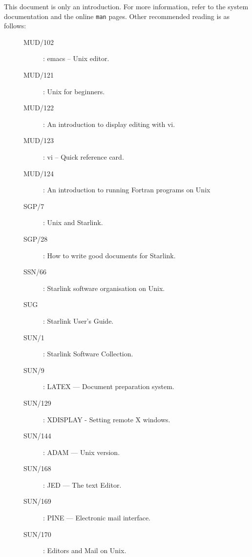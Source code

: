 \documentclass[twoside,11pt]{article}
\newcommand{\xref}[3]{#1}
\begin{document}
This document is only an introduction.
For more information, refer to the system documentation and the online {\tt man}
pages.
Other recommended reading is as follows:

\begin{description}
\item[\mbox{}]\mbox{}
\begin{description}
\item [MUD/102]: emacs -- Unix editor.
\item [MUD/121]: Unix for beginners.
\item [MUD/122]: An introduction to display editing with vi.
\item [MUD/123]: vi -- Quick reference card.
\item [MUD/124]: An introduction to running Fortran programs on Unix
\item [\xref{SGP/7}{sgp7}{}]: Unix and Starlink.
\item [\xref{SGP/28}{sgp28}{}]: How to write good documents for Starlink.
\item [\xref{SSN/66}{ssn66}{}]: Starlink software organisation on Unix.
\item [\xref{SUG}{sug}{}]: Starlink User's Guide.
\item [\xref{SUN/1}{sun1}{}]: Starlink Software Collection.
\item [\xref{SUN/9}{sun9}{}]: LATEX --- Document preparation system.
\item [\xref{SUN/129}{sun129}{}]: XDISPLAY - Setting remote X windows.
\item [\xref{SUN/144}{sun144}{}]: ADAM --- Unix version.
\item [\xref{SUN/168}{sun168}{}]: JED --- The text Editor.
\item [\xref{SUN/169}{sun169}{}]: PINE --- Electronic mail interface.
\item [\xref{SUN/170}{sun170}{}]: Editors and Mail on Unix.
\end{description}

\end{description}
\end{document}
